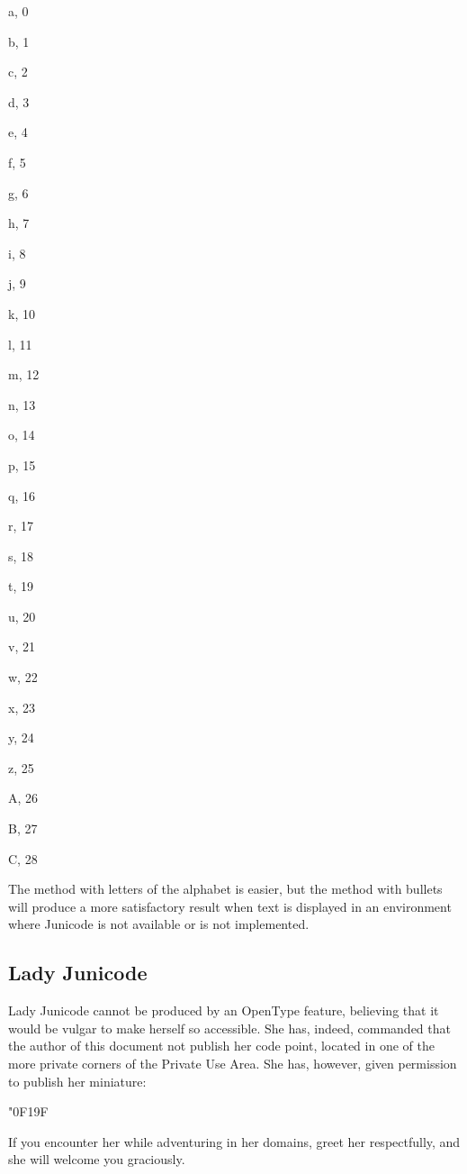 \begin{multicols}{4}
a,  0{\tabto{4em}}

b,  1{\tabto{4em}}

c,  2{\tabto{4em}}

d,  3{\tabto{4em}}

e,  4{\tabto{4em}}

f,  5{\tabto{4em}}

g,  6{\tabto{4em}}

h,  7{\tabto{4em}}

i,  8{\tabto{4em}}

j,  9{\tabto{4em}}

k, 10{\tabto{4em}}

l, 11{\tabto{4em}}

m, 12{\tabto{4em}}

n, 13{\tabto{4em}}

o, 14{\tabto{4em}}

p, 15{\tabto{4em}}

q, 16{\tabto{4em}}

r, 17{\tabto{4em}}

s, 18{\tabto{4em}}

t, 19{\tabto{4em}}

u, 20{\tabto{4em}}

v, 21{\tabto{4em}}

w, 22{\tabto{4em}}

x, 23{\tabto{4em}}

y, 24{\tabto{4em}}

z, 25{\tabto{4em}}

A, 26{\tabto{4em}}

B, 27{\tabto{4em}}

C, 28{\tabto{4em}}
\end{multicols}

\noindent The method with letters of the alphabet is easier, but the method with bullets will produce a more satisfactory result
when text is displayed in an environment where Junicode is not available or  is not
implemented.

\subsection{Lady Junicode}
Lady Junicode cannot be produced by an OpenType feature, believing that it would be vulgar to make herself so accessible. She has, indeed,
commanded that the author of this document not publish her code point, located in one of the more private corners of the
Private Use Area. She has, however, given permission to publish her miniature:
\begin{center}
{\huge\char"0F19F}
\end{center}
If you encounter her while adventuring in her domains, greet her respectfully, and she will welcome you graciously.

